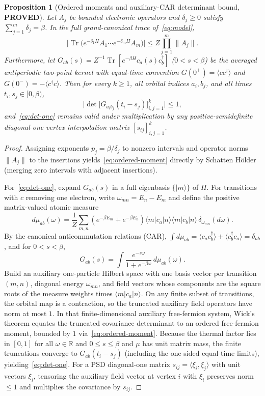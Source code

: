 \documentclass[11pt]{article}
\newtheorem{proposition}{Proposition}
\theoremstyle{remark}
\DeclareMathOperator{\Tr}{Tr}
\newcommand{\proved}{\textbf{PROVED}}
\begin{document}
\begin{proposition}[Ordered moments and auxiliary-CAR determinant bound, \proved]\label{prop:car-det}
Let $A_j$ be bounded electronic operators and $\delta_j\ge 0$ satisfy $\sum_{j=1}^m\delta_j=\beta$. In the full grand-canonical trace of~\eqref{eq:model},
\begin{equation}\label{eq:ordered-moment}
 \bigl|\Tr\bigl(e^{-\delta_1 H}A_1\cdots e^{-\delta_m H}A_m\bigr)\bigr|\le Z\prod_{j=1}^m \|A_j\|.
\end{equation}
Furthermore, let $G_{ab}(s)=Z^{-1}\Tr[e^{-\beta H}c_a(s)c_b^\dagger]$ ($0<s<\beta$) be the averaged antiperiodic two-point kernel with equal-time convention $G(0^+)=\langle cc^\dagger\rangle$ and $G(0^-)=-\langle c^\dagger c\rangle$. Then for every $k\ge 1$, all orbital indices $a_i,b_j$, and all times $t_i,s_j\in[0,\beta)$,
\begin{equation}\label{eq:det-one}
 \bigl|\det\bigl[G_{a_i b_j}(t_i-s_j)\bigr]_{i,j=1}^k\bigr|\le 1,
\end{equation}
and~\eqref{eq:det-one} remains valid under multiplication by any positive-semidefinite diagonal-one vertex interpolation matrix $[s_{ij}]_{i,j=1}^k$.
\end{proposition}

\begin{proof}
Assigning exponents $p_j=\beta/\delta_j$ to nonzero intervals and operator norms $\|A_j\|$ to the insertions yields~\eqref{eq:ordered-moment} directly by Schatten H\"older (merging zero intervals with adjacent insertions).

For~\eqref{eq:det-one}, expand $G_{ab}(s)$ in a full eigenbasis $\{|m\rangle\}$ of $H$. For transitions with $c$ removing one electron, write $\omega_{mn}=E_n-E_m$ and define the positive matrix-valued atomic measure
\[
 d\mu_{ab}(\omega)=\frac{1}{Z}\sum_{m,n}(e^{-\beta E_m}+e^{-\beta E_n})
 \langle m|c_a|n\rangle\overline{\langle m|c_b|n\rangle}\,\delta_{\omega_{mn}}(d\omega).
\]
By the canonical anticommutation relations (CAR), $\int d\mu_{ab}=\langle c_a c_b^\dagger\rangle+\langle c_b^\dagger c_a\rangle=\delta_{ab}$, and for $0<s<\beta$,
\[
 G_{ab}(s)=\int \frac{e^{-s\omega}}{1+e^{-\beta\omega}}\,d\mu_{ab}(\omega).
\]
Build an auxiliary one-particle Hilbert space with one basis vector per transition $(m,n)$, diagonal energy $\omega_{mn}$, and field vectors whose components are the square roots of the measure weights times $\langle m|c_a|n\rangle$. On any finite subset of transitions, the orbital map is a contraction, so the truncated auxiliary field operators have norm at most $1$. In that finite-dimensional auxiliary free-fermion system, Wick's theorem equates the truncated covariance determinant to an ordered free-fermion moment, bounded by $1$ via~\eqref{eq:ordered-moment}. Because the thermal factor lies in $[0,1]$ for all $\omega\in\mathbb R$ and $0\le s\le\beta$ and $\mu$ has unit matrix mass, the finite truncations converge to $G_{ab}(t_i-s_j)$ (including the one-sided equal-time limits), yielding~\eqref{eq:det-one}. For a PSD diagonal-one matrix $s_{ij}=\langle\xi_i,\xi_j\rangle$ with unit vectors $\xi_i$, tensoring the auxiliary field vector at vertex $i$ with $\xi_i$ preserves norm $\le 1$ and multiplies the covariance by $s_{ij}$.
\end{proof}
\end{document}
